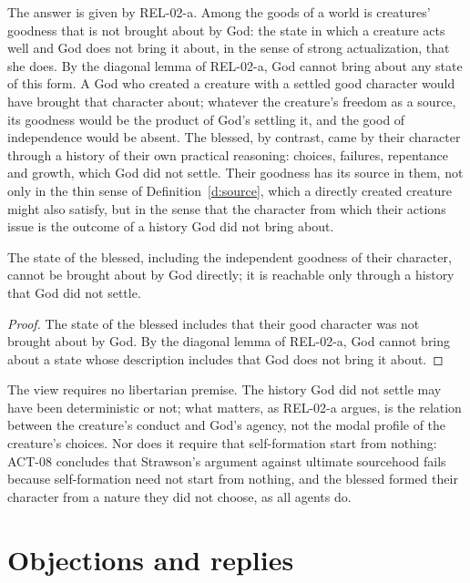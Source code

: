 \documentclass{situationist-preprint}
\begin{document}
The answer is given by REL-02-a. Among the goods of a world is creatures' goodness that is not brought about by God: the state in which a creature acts well and God does not bring it about, in the sense of strong actualization, that she does. By the diagonal lemma of REL-02-a, God cannot bring about any state of this form. A God who created a creature with a settled good character would have brought that character about; whatever the creature's freedom as a source, its goodness would be the product of God's settling it, and the good of independence would be absent. The blessed, by contrast, came by their character through a history of their own practical reasoning: choices, failures, repentance and growth, which God did not settle. Their goodness has its source in them, not only in the thin sense of Definition~\ref{d:source}, which a directly created creature might also satisfy, but in the sense that the character from which their actions issue is the outcome of a history God did not bring about.

\begin{corollary}\label{c:direct}
The state of the blessed, including the independent goodness of their character, cannot be brought about by God directly; it is reachable only through a history that God did not settle.
\end{corollary}

\begin{proof}
The state of the blessed includes that their good character was not brought about by God. By the diagonal lemma of REL-02-a, God cannot bring about a state whose description includes that God does not bring it about.
\end{proof}

The view requires no libertarian premise. The history God did not settle may have been deterministic or not; what matters, as REL-02-a argues, is the relation between the creature's conduct and God's agency, not the modal profile of the creature's choices. Nor does it require that self-formation start from nothing: ACT-08 concludes that Strawson's argument against ultimate sourcehood \citep{GStrawson1994} fails because self-formation need not start from nothing, and the blessed formed their character from a nature they did not choose, as all agents do.

\section{Objections and replies}
\end{document}
